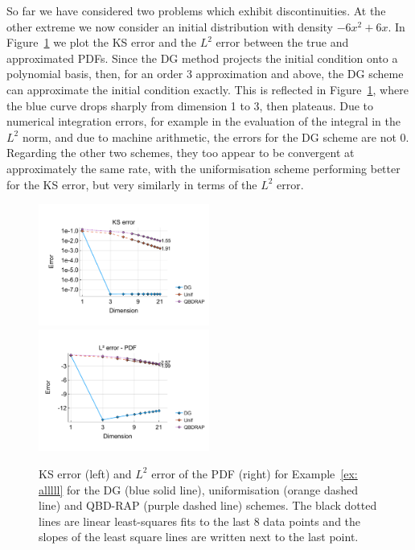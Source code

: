 \begin{example}\label{ex: alllll}
	So far we have considered two problems which exhibit discontinuities. At the other extreme we now consider an initial distribution with density \(-6x^2+6x\). In Figure~\ref{fig: fun 6 comp} we plot the KS error and the \(L^2\) error between the true and approximated PDFs. Since the DG method projects the initial condition onto a polynomial basis, then, for an order 3 approximation and above, the DG scheme can approximate the initial condition exactly. This is reflected in Figure~\ref{fig: fun 6 comp}, where the blue curve drops sharply from dimension 1 to 3, then plateaus. Due to numerical integration errors, for example in the evaluation of the integral in the \(L^2\) norm, and due to machine arithmetic, the errors for the DG scheme are not 0. Regarding the other two schemes, they too appear to be convergent at approximately the same rate, with the uniformisation scheme performing better for the KS error, but very similarly in terms of the \(L^2\) error. 
\begin{figure}[h]
	\centering
	\includegraphics[width=0.5\textwidth,trim={0.5cm 0.8cm 0.2cm 1.25cm},clip]{chapter6/figs/comp/fun6/meshs_ks_error_formatted.pdf}%
	\includegraphics[width=0.5\textwidth,trim={0.5cm 0.8cm 0.2cm 1.25cm},clip]{chapter6/figs/comp/fun6/meshs_l2_pdf_error_formatted.pdf}
	\caption{KS error (left) and \(L^2\) error of the PDF (right) for Example~\ref{ex: alllll} for the DG (blue solid line), uniformisation (orange dashed line) and QBD-RAP (purple dashed line) schemes. The black dotted lines are linear least-squares fits to the last 8 data points and the slopes of the least square lines are written next to the last point.}
	\label{fig: fun 6 comp} 
\end{figure}
\exampleFloatBarrier
\end{example}


